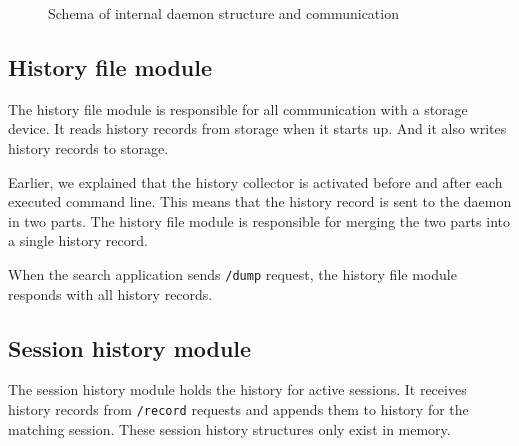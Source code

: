 \begin{figure}
\centering
{}
\caption{Schema of internal daemon structure and communication}
\label{impl-daemon-channels}
\end{figure}

\subsection{History file module}

The history file module is responsible for all communication with a storage device. It reads history records from storage when it starts up. And it also writes history records to storage.

Earlier, we explained that the history collector is activated before and after each executed command line. This means that the history record is sent to the daemon in two parts. The history file module is responsible for merging the two parts into a single history record. 

When the search application sends \verb|/dump| request, the history file module responds with all history records. 


\subsection{Session history module}

The session history module holds the history for active sessions. It receives history records from \verb|/record| requests and appends them to history for the matching session.
These session history structures only exist in memory.

